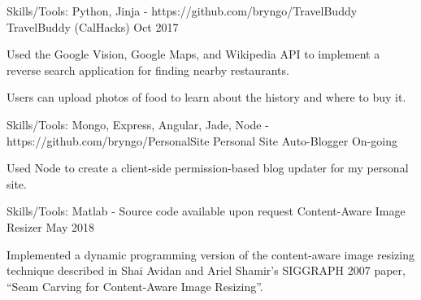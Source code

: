 

\begin{cventries}

  \cventry
  {Skills/Tools: Python, Jinja - https://github.com/bryngo/TravelBuddy} %
  {TravelBuddy (CalHacks)} %
  {} %
  {Oct 2017} %
  {
  \begin{cvitems} %
    \item {Used the Google Vision, Google Maps, and Wikipedia API to implement a reverse search application for finding nearby restaurants.}
    \item {Users can upload photos of food to learn about the history and where to buy it.}
  \end{cvitems}
  }


  \cventry
  {Skills/Tools: Mongo, Express, Angular, Jade, Node - https://github.com/bryngo/PersonalSite} %
  {Personal Site Auto-Blogger} %
  {} %
  {On-going} %
  {
  \begin{cvitems} %
    \item {Used Node to create a client-side permission-based blog updater for my personal site.}
  \end{cvitems}
  }


  \cventry
  {Skills/Tools: Matlab - Source code available upon request} %
  {Content-Aware Image Resizer} %
  {} %
  {May 2018} %
  {
  \begin{cvitems} %
    \item {Implemented a dynamic programming version of the content-aware image resizing technique described in Shai Avidan and Ariel Shamir’s SIGGRAPH 2007 paper, “Seam Carving for Content-Aware Image Resizing”.}
  \end{cvitems}
  }

\end{cventries}
